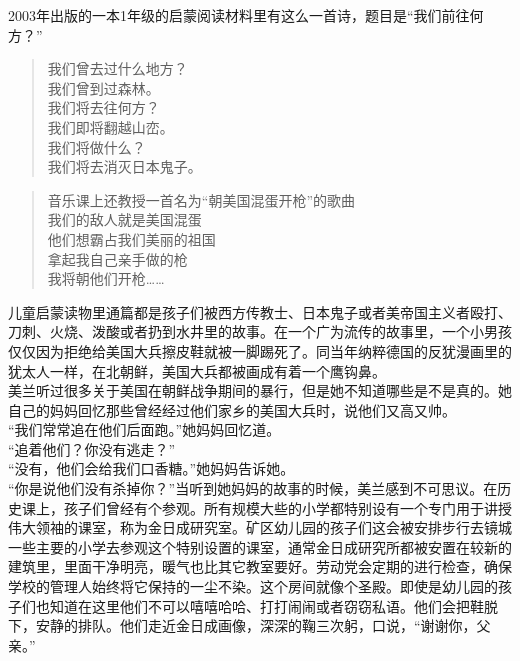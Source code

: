 2003年出版的一本1年级的启蒙阅读材料里有这么一首诗，题目是“我们前往何方？”\\

\begin{quote}
	我们曾去过什么地方？\\

	我们曾到过森林。\\

	我们将去往何方？\\

	我们即将翻越山峦。\\

	我们将做什么？\\

	我们将去消灭日本鬼子。\\
\end{quote}

\begin{quote}
	音乐课上还教授一首名为“朝美国混蛋开枪”的歌曲\\

	我们的敌人就是美国混蛋\\

	他们想霸占我们美丽的祖国\\

	拿起我自己亲手做的枪\\

	我将朝他们开枪……\\
\end{quote}

儿童启蒙读物里通篇都是孩子们被西方传教士、日本鬼子或者美帝国主义者殴打、刀刺、火烧、泼酸或者扔到水井里的故事。在一个广为流传的故事里，一个小男孩仅仅因为拒绝给美国大兵擦皮鞋就被一脚踢死了。同当年纳粹德国的反犹漫画里的犹太人一样，在北朝鲜，美国大兵都被画成有着一个鹰钩鼻。\\

美兰听过很多关于美国在朝鲜战争期间的暴行，但是她不知道哪些是不是真的。她自己的妈妈回忆那些曾经经过他们家乡的美国大兵时，说他们又高又帅。\\

“我们常常追在他们后面跑。”她妈妈回忆道。\\

“追着他们？你没有逃走？”\\

“没有，他们会给我们口香糖。”她妈妈告诉她。\\

“你是说他们没有杀掉你？”当听到她妈妈的故事的时候，美兰感到不可思议。在历史课上，孩子们曾经有个参观。所有规模大些的小学都特别设有一个专门用于讲授伟大领袖的课室，称为金日成研究室。矿区幼儿园的孩子们这会被安排步行去镜城一些主要的小学去参观这个特别设置的课室，通常金日成研究所都被安置在较新的建筑里，里面干净明亮，暖气也比其它教室要好。劳动党会定期的进行检查，确保学校的管理人始终将它保持的一尘不染。这个房间就像个圣殿。即使是幼儿园的孩子们也知道在这里他们不可以嘻嘻哈哈、打打闹闹或者窃窃私语。他们会把鞋脱下，安静的排队。他们走近金日成画像，深深的鞠三次躬，口说，“谢谢你，父亲。”\\

